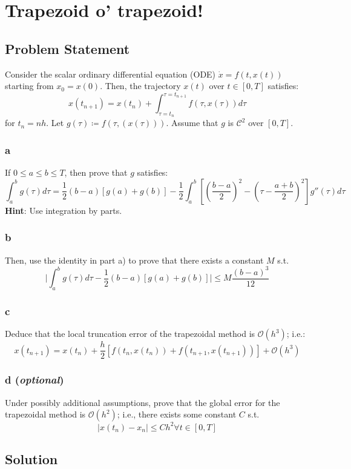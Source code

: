 \documentclass[11pt]{report}
\theoremstyle{definition}
\begin{document}
\section*{Trapezoid o' trapezoid!}
\subsection*{Problem Statement}
Consider the scalar ordinary differential equation (ODE) $\dot{x}=f(t,x(t))$
starting from $x_0=x(0)$. Then, the trajectory $x(t)$ over $t\in[0,T]$ satisfies:
\[x(t_{n+1})=x(t_n)+\int_{\tau=t_n}^{\tau=t_{n+1}}f(\tau,x(\tau))d\tau\]
for $t_n=nh$. Let $g(\tau)\coloneqq f(\tau,(x(\tau)))$. Assume that $g$ is $\mathcal{C}^2$
over $[0,T]$.

\subsubsection*{a}
If $0\leq a\leq b\leq T$, then prove that $g$ satisfies:
\[
	\int_{a}^{b} g(\tau)d\tau
	= \frac{1}{2}(b-a)[g(a)+g(b)]
	- \frac{1}{2}\int_{a}^{b}\left[
		\left(\frac{b-a}{2}\right)^2 -
		\left(\tau - \frac{a+b}{2}\right)^2
		\right]
	g''(\tau)d\tau
\]
\textbf{Hint}: Use integration by parts.
\subsubsection*{b}
Then, use the identity in part a) to prove that there exists a constant $M$ s.t.
\[
	\bigg|
	\int_{a}^{b}g(\tau)d\tau - \frac{1}{2}(b-a)[g(a)+g(b)]
	\bigg|
	\leq M\frac{(b-a)^3}{12}
\]

\subsubsection*{c}
Deduce that the local truncation error of the trapezoidal method is $\mathcal{O}(h^3)$;
i.e.:
\[
	x(t_{n+1})=x(t_n) + \frac{h}{2}[f(t_n,x(t_n))+f(t_{n+1},x(t_{n+1}))]
	+ \mathcal{O}(h^3)
\]

\subsubsection*{d (\textit{optional})}
Under possibly additional assumptions, prove that the global error for the trapezoidal
method is $\mathcal{O}(h^2)$; i.e., there exists some constant $C$ s.t.
\[|x(t_n)-x_n|\leq Ch^2\forall t\in[0, T]\]


\subsection*{Solution}
\end{document}
